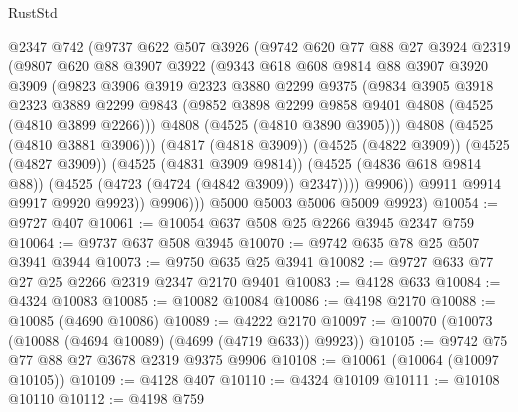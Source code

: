 \begin{lexlean}{RustStd}
\begin{coremodule}
                @2347
                @742
                (@9737
                  @622
                  @507
                  @3926
                  (@9742
                    @620
                    @77
                    @88
                    @27
                    @3924
                    @2319
                    (@9807
                      @620
                      @88
                      @3907
                      @3922
                      (@9343
                        @618
                        @608
                        @9814
                        @88
                        @3907
                        @3920
                        @3909
                        (@9823
                          @3906
                          @3919
                          @2323
                          @3880
                          @2299
                          @9375
                          (@9834
                            @3905
                            @3918
                            @2323
                            @3889
                            @2299
                            @9843
                            (@9852 @3898 @2299 @9858 @9401 @4808 (@4525 (@4810 @3899 @2266)))
                            @4808
                            (@4525 (@4810 @3890 @3905)))
                          @4808
                          (@4525 (@4810 @3881 @3906)))
                        (@4817 (@4818 @3909))
                        (@4525 (@4822 @3909))
                        (@4525 (@4827 @3909))
                        (@4525 (@4831 @3909 @9814))
                        (@4525 (@4836 @618 @9814 @88))
                        (@4525 (@4723 (@4724 (@4842 @3909)) @2347))))
                    @9906))
                @9911
                @9914
                @9917
                @9920
                @9923))
            @9906)))
      @5000
      @5003
      @5006
      @5009
      @9923)
@10054 := @9727 @407
@10061 := @10054 @637 @508 @25 @2266 @3945 @2347 @759
@10064 := @9737 @637 @508 @3945
@10070 := @9742 @635 @78 @25 @507 @3941 @3944
@10073 := @9750 @635 @25 @3941
@10082 := @9727 @633 @77 @27 @25 @2266 @2319 @2347 @2170 @9401
@10083 := @4128 @633
@10084 := @4324 @10083
@10085 := @10082 @10084
@10086 := @4198 @2170
@10088 := @10085 (@4690 @10086)
@10089 := @4222 @2170
@10097 := @10070 (@10073 (@10088 (@4694 @10089) (@4699 (@4719 @633)) @9923))
@10105 := @9742 @75 @77 @88 @27 @3678 @2319 @9375 @9906
@10108 := @10061 (@10064 (@10097 @10105))
@10109 := @4128 @407
@10110 := @4324 @10109
@10111 := @10108 @10110
@10112 := @4198 @759

\end{coremodule}
\end{lexlean}
